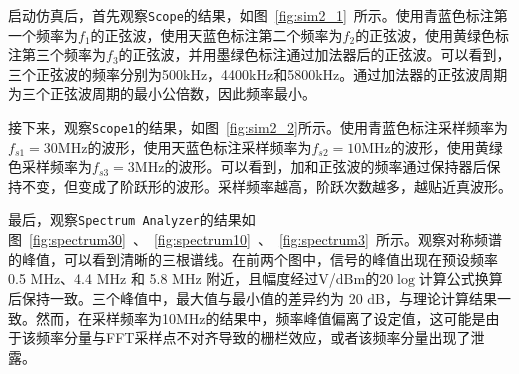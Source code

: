 \documentclass[lang=cn,newtx,10pt,scheme=chinese]{elegantbook}
\begin{document}
启动仿真后，首先观察\lstinline{Scope}的结果，如图~\ref{fig:sim2_1}~所示。使用青蓝色标注第一个频率为$f_1$的正弦波，使用天蓝色标注第二个频率为$f_2$的正弦波，使用黄绿色标注第三个频率为$f_3$的正弦波，并用墨绿色标注通过加法器后的正弦波。可以看到，三个正弦波的频率分别为500kHz，4400kHz和5800kHz。通过加法器的正弦波周期为三个正弦波周期的最小公倍数，因此频率最小。

接下来，观察\lstinline{Scope1}的结果，如图~\ref{fig:sim2_2}所示。使用青蓝色标注采样频率为$f_{s1} = 30$MHz的波形，使用天蓝色标注采样频率为$f_{s2} = 10$MHz的波形，使用黄绿色采样频率为$f_{s3} = 3$MHz的波形。可以看到，加和正弦波的频率通过保持器后保持不变，但变成了阶跃形的波形。采样频率越高，阶跃次数越多，越贴近真波形。

最后，观察\lstinline{Spectrum Analyzer}的结果如图~\ref{fig:spectrum30}~、~\ref{fig:spectrum10}~、~\ref{fig:spectrum3}~所示。观察对称频谱的峰值，可以看到清晰的三根谱线。在前两个图中，信号的峰值出现在预设频率 0.5 MHz、4.4 MHz 和 5.8 MHz 附近，且幅度经过V/dBm的$20\log$计算公式换算后保持一致。三个峰值中，最大值与最小值的差异约为 20 dB，与理论计算结果一致。然而，在采样频率为10MHz的结果中，频率峰值偏离了设定值，这可能是由于该频率分量与FFT采样点不对齐导致的栅栏效应，或者该频率分量出现了泄露。  
\end{document}
